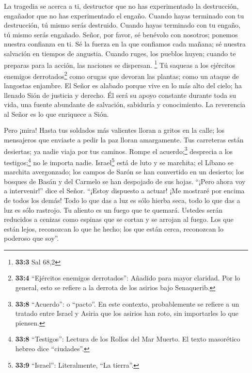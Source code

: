  La tragedia se acerca a ti, destructor que no has
experimentado la destrucción, engañador que no has experimentado el
engaño. Cuando hayas terminado con tu destrucción, tú mismo serás
destruido. Cuando hayas terminado con tu engaño, tú mismo serás
engañado.  Señor, por favor, sé benévolo con nosotros;
ponemos nuestra confianza en ti. Sé la fuerza en la que confiamos cada
mañana; sé nuestra salvación en tiempos de angustia. 
Cuando ruges, los pueblos huyen; cuando te preparas para la acción, las
naciones se dispersan. \footnote{\textbf{33:3} Sal 68,2} 
Tú saqueas a los ejércitos enemigos derrotados\footnote{\textbf{33:4}
  ``Ejércitos enemigos derrotados'': Añadido para mayor claridad. Por lo
  general, esto se refiere a la derrota de los asirios bajo Senaquerib.}
como orugas que devoran las plantas; como un ataque de langostas
enjambre.  El Señor es alabado porque vive en lo más alto
del cielo; ha llenado Sión de justicia y derecho.  Él será
su apoyo constante durante toda su vida, una fuente abundante de
salvación, sabiduría y conocimiento. La reverencia al Señor es lo que
enriquece a Sión.

 Pero ¡mira! Hasta tus soldados más valientes lloran a
gritos en la calle; los mensajeros que enviaste a pedir la paz lloran
amargamente.  Tus carreteras están desiertas; ya nadie
viaja por tus caminos. Rompe el acuerdo;\footnote{\textbf{33:8}
  ``Acuerdo'': o ``pacto''. En este contexto, probablemente se refiere a
  un tratado entre Israel y Asiria que los asirios han roto, sin
  importarles lo que piensen.} desprecia a los testigos;\footnote{\textbf{33:8}
  ``Testigos'': Lectura de los Rollos del Mar Muerto. El texto
  masorético hebreo dice ``ciudades''.} no le importa nadie.
 Israel\footnote{\textbf{33:9} ``Israel'': Literalmente,
  ``La tierra''.} está de luto y se marchita; el Líbano se marchita
avergonzado; los campos de Sarón se han convertido en un desierto; los
bosques de Basán y del Carmelo se han despojado de sus hojas.
 ``¡Pero ahora voy a intervenir!'' dice el Señor.
``¡Estoy dispuesto a actuar! ¡Me mostraré por encima de todos los demás!
 Todo lo que das a luz es sólo hierba seca, todo lo que
das a luz es sólo rastrojo. Tu aliento es un fuego que te quemará.
 Ustedes serán reducidos a cenizas como espinas que se
cortan y se arrojan al fuego.  Los que están lejos,
reconozcan lo que he hecho; los que están cerca, reconozcan lo poderoso
que soy''.

